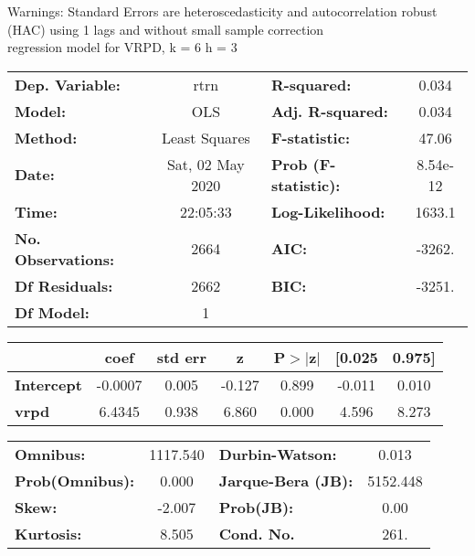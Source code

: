 Warnings: \newline
 [1] Standard Errors are heteroscedasticity and autocorrelation robust (HAC) using 1 lags and without small sample correction\\ 

regression model for VRPD, k = 6 h = 3\begin{center}
\begin{tabular}{lclc}
\toprule
\textbf{Dep. Variable:}    &       rtrn       & \textbf{  R-squared:         } &     0.034   \\
\textbf{Model:}            &       OLS        & \textbf{  Adj. R-squared:    } &     0.034   \\
\textbf{Method:}           &  Least Squares   & \textbf{  F-statistic:       } &     47.06   \\
\textbf{Date:}             & Sat, 02 May 2020 & \textbf{  Prob (F-statistic):} &  8.54e-12   \\
\textbf{Time:}             &     22:05:33     & \textbf{  Log-Likelihood:    } &    1633.1   \\
\textbf{No. Observations:} &        2664      & \textbf{  AIC:               } &    -3262.   \\
\textbf{Df Residuals:}     &        2662      & \textbf{  BIC:               } &    -3251.   \\
\textbf{Df Model:}         &           1      & \textbf{                     } &             \\
\bottomrule
\end{tabular}
\begin{tabular}{lcccccc}
                   & \textbf{coef} & \textbf{std err} & \textbf{z} & \textbf{P$> |$z$|$} & \textbf{[0.025} & \textbf{0.975]}  \\
\midrule
\textbf{Intercept} &      -0.0007  &        0.005     &    -0.127  &         0.899        &       -0.011    &        0.010     \\
\textbf{vrpd}      &       6.4345  &        0.938     &     6.860  &         0.000        &        4.596    &        8.273     \\
\bottomrule
\end{tabular}
\begin{tabular}{lclc}
\textbf{Omnibus:}       & 1117.540 & \textbf{  Durbin-Watson:     } &    0.013  \\
\textbf{Prob(Omnibus):} &   0.000  & \textbf{  Jarque-Bera (JB):  } & 5152.448  \\
\textbf{Skew:}          &  -2.007  & \textbf{  Prob(JB):          } &     0.00  \\
\textbf{Kurtosis:}      &   8.505  & \textbf{  Cond. No.          } &     261.  \\
\bottomrule
\end{tabular}
\end{center}

